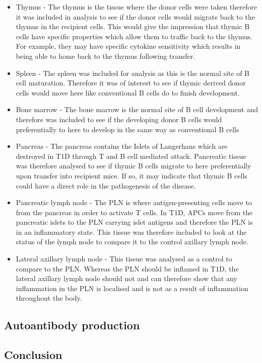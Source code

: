 \begin{itemize}
\item Thymus - The thymus is the tissue where the donor cells were taken therefore it was included in analysis to see if the donor cells would migrate back to the thymus in the recipient cells.
This would give the impression that thymic B cells have specific properties which allow them to traffic back to the thymus.
For example, they may have specific cytokine sensitivity which results in being able to home back to the thymus following transfer.
\item Spleen - The spleen was included for analysis as this is the normal site of B cell maturation.
Therefore it was of interest to see if thymic derived donor cells would move here like conventional B cells do to finish development.
\item Bone marrow - The bone marrow is the normal site of B cell development and therefore was included to see if the developing donor B cells would preferentially to here to develop in the same way as conventional B cells
\item Pancreas - The pancreas contains the Islets of Langerhans which are destroyed in T1D through T and B cell mediated attack.
Pancreatic tissue was therefore analysed to see if thymic B cells migrate to here preferentially upon transfer into recipient mice.
If so, it may indicate that thymic B cells could have a direct role in the pathogenesis of the disease.
\item Pancreatic lymph node - The PLN is where antigen-presenting cells move to from the pancreas in order to activate T cells.
In T1D, APCs move from the pancreatic islets to the PLN carrying islet antigens and therefore the PLN is in an inflammatory state.
This tissue was therefore included to look at the status of the lymph node to compare it to the control axillary lymph node.
\item Lateral axillary lymph node - This tissue was analysed as a control to compare to the PLN.
Whereas the PLN should be inflamed in T1D, the lateral axillary lymph node should not and can therefore show that any inflammation in the PLN is localised and is not as a result of inflammation throughout the body.
\end{itemize}

\subsection{Autoantibody production}

\subsection{Conclusion}

